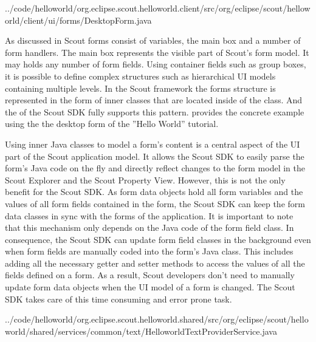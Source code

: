 \documentclass[a4paper,10pt,twoside]{book}
\begin{document}

{../code/helloworld/org.eclipse.scout.helloworld.client/src/org/eclipse/scout/helloworld/client/ui/forms/DesktopForm.java}

As discussed in  Scout forms consist of variables, the main box and a number of form handlers.
The main box represents the visible part of Scout's form model.
It may holds any number of form fields.
Using container fields such as group boxes, it is possible to define complex structures such as hierarchical UI models containing multiple levels.
In the Scout framework the forms structure is represented in the form of inner classes that are located inside of the  class.
And the  of the Scout SDK fully supports this pattern.
 provides the concrete example using the the desktop form of the ''Hello World'' tutorial.

Using inner Java classes to model a form's content is a central aspect of the UI part of the Scout application model.
It allows the Scout SDK to easily parse the form's Java code on the fly and directly reflect changes to the form model in the Scout Explorer and the Scout Property View.
However, this is not the only benefit for the Scout SDK.
As form data objects hold all form variables and the values of all form fields contained in the form, the Scout SDK can keep the form data classes in sync with the forms of the application.
It is important to note that this mechanism only depends on the Java code of the form field class.
In consequence, the Scout SDK can update form field classes in the background even when form fields are manually coded into the form's Java class.
This includes adding all the necessary getter and setter methods to access the values of all the fields defined on a form.
As a result, Scout developers don't need to manually update form data objects when the UI model of a form is changed.
The Scout SDK takes care of this time consuming and error prone task.


{../code/helloworld/org.eclipse.scout.helloworld.shared/src/org/eclipse/scout/helloworld/shared/services/common/text/HelloworldTextProviderService.java}
\end{document}
